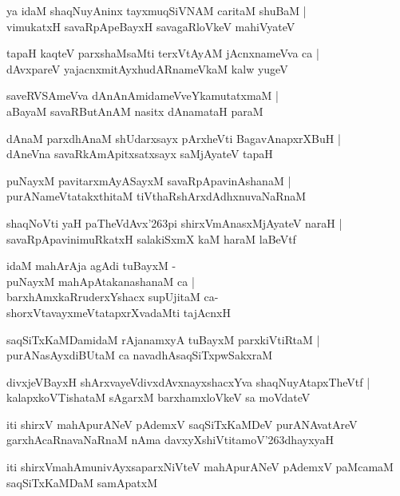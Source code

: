\documentclass[twoside,12pt,openright]{book}
\def\S{\char'263}
\newcounter{shloka}[chapter]
\begin{document}
\begin{shloka}%
ya idaM shaqNuyAninx tayxmuqSiVNAM caritaM shuBaM |\\
vimukatxH savaRpApeBayxH savagaRloVkeV mahiVyateV 
\end{shloka}

\begin{shloka}%
tapaH kaqteV parxshaMsaMti terxVtAyAM jAcnxnameVva ca |\\
dAvxpareV yajacnxmitAyxhudARnameVkaM kalw yugeV 
\end{shloka}

\begin{shloka}%
saveRVSAmeVva dAnAnAmidameVveYkamutatxmaM |\\
aBayaM savaRButAnAM nasitx dAnamataH paraM 
\end{shloka}

\begin{shloka}%
dAnaM parxdhAnaM shUdarxsayx pArxheVti BagavAnapxrXBuH |\\
dAneVna savaRkAmApitxsatxsayx saMjAyateV tapaH 
\end{shloka}

\begin{shloka}%
puNayxM pavitarxmAyASayxM savaRpApavinAshanaM |\\
purANameVtatakxthitaM tiVthaRshArxdAdhxnuvaNaRnaM 
\end{shloka}

\begin{shloka}%
shaqNoVti yaH paTheVdAvx\S pi shirxVmAnasxMjAyateV naraH |\\
savaRpApavinimuRkatxH salakiSxmX kaM haraM laBeVtf 
\end{shloka}

\begin{shloka}%
idaM mahArAja agAdi tuBayxM -\\
puNayxM mahApAtakanashanaM ca |\\
barxhAmxkaRruderxYshacx supUjitaM ca-\\
shorxVtavayxmeVtatapxrXvadaMti tajAcnxH 
\end{shloka}

\begin{shloka}%
saqSiTxKaMDamidaM rAjanamxyA tuBayxM parxkiVtiRtaM |\\
purANasAyxdiBUtaM ca navadhAsaqSiTxpwSakxraM 
\end{shloka}

\begin{shloka}%
divxjeVBayxH shArxvayeVdivxdAvxnayxshacxYva shaqNuyAtapxTheVtf |\\
kalapxkoVTishataM sAgarxM barxhamxloVkeV sa moVdateV 
\end{shloka}

\begin{center}
iti shirxV mahApurANeV pAdemxV saqSiTxKaMDeV purANAvatAreV garxhAcaRnavaNaRnaM nAma 
davxyXshiVtitamoV\S dhayxyaH 
\end{center}

\begin{center}
iti shirxVmahAmunivAyxsaparxNiVteV mahApurANeV pAdemxV paMcamaM saqSiTxKaMDaM samApatxM 
\end{center}
\end{document}
